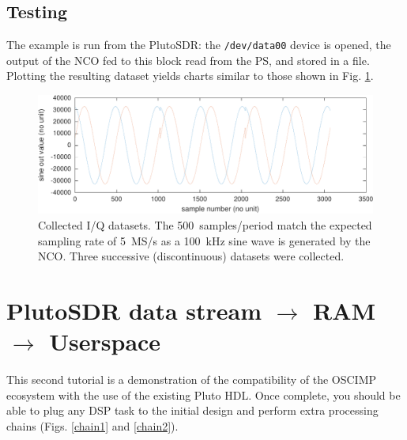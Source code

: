 \documentclass[12pt,oneside]{article}
\begin{document}
\subsection{Testing}

The example is run from the PlutoSDR: the {\tt /dev/data00} device is opened, the output
of the NCO fed to this block read from the PS, and stored in a file. Plotting the resulting
dataset yields charts similar to those shown in Fig. \ref{nco}.

\begin{figure}[h!tb]
\includegraphics[width=\linewidth]{NCO.pdf}
\caption{Collected I/Q datasets. The 500~samples/period match the expected sampling
rate of 5~MS/s as a 100~kHz sine wave is generated by the NCO. Three successive (discontinuous)
datasets were collected.}%
\label{nco}
\end{figure}

\section{PlutoSDR data stream $\to$ RAM $\to$ Userspace}
This second tutorial is a demonstration of the compatibility of the OSCIMP
ecosystem with the use of the existing Pluto HDL.
Once complete, you should be able to plug any DSP task to the initial design and
perform extra processing chains (Figs. \ref{chain1} and \ref{chain2}).
\end{document}
